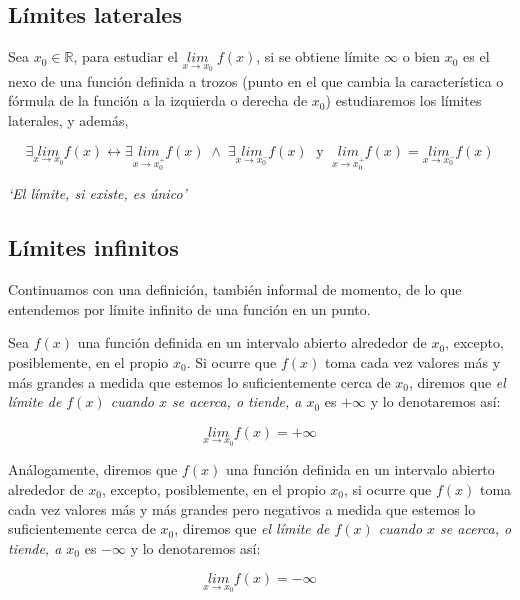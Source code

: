 	
	\subsection{Límites laterales}
	
	
	Sea $x_0 \in \mathbb R$, para estudiar el $ \underset { x\rightarrow x_0}{ lim } \; {f(x)}$, si se obtiene límite $\infty$ o bien $x_0$ es el nexo de una función definida a trozos (punto en el que cambia la característica o fórmula de la función a la izquierda o derecha de $x_0$) estudiaremos los límites laterales, y además,
	
	\begin{equation}	
	\exists \underset {x\to x_0}{lim}{f(x)} \leftrightarrow \exists \underset {x\to x_0^+}{lim}{f(x)} \; \wedge \;  \exists \underset {x\to x_0^-}{lim}{f(x)} \; \mbox { y } \;   \underset {x\to x_0^+}{lim}{f(x)}= \underset {x\to x_0^-}{lim}{f(x)}
	\end{equation}
	
	 \emph{`El límite, si existe, es único'}
	
	\subsection{Límites infinitos}
	
	Continuamos con una definición, también informal de momento, de lo que entendemos por límite infinito de una función en un punto.
	
	\begin{defi}
	
	Sea $f(x)$ una función definida en un intervalo abierto alrededor de $x_0$, excepto, posiblemente, en el propio $x_0$. Si ocurre que $f(x)$ toma cada vez valores más y más grandes  a medida que estemos lo suficientemente cerca de $x_0$, diremos que \textit{el límite de $f(x)$ cuando $x$ se acerca, o tiende, a $x_0$} es $+\infty$ y lo denotaremos así:
	
	\begin{equation}
		\underset { x\rightarrow x_0 }{ lim } {f(x)}=+\infty
	\end{equation}
	
	Análogamente, diremos que $f(x)$ una función definida en un intervalo abierto alrededor de $x_0$, excepto, posiblemente, en el propio $x_0$, si ocurre que $f(x)$ toma cada vez valores más y más grandes pero negativos a medida que estemos lo suficientemente cerca de $x_0$, diremos que \textit{el límite de $f(x)$  cuando $x$ se acerca, o tiende, a $x_0$} es $-\infty$ y lo denotaremos así:
	
	\begin{equation}
		\underset { x\rightarrow x_0 }{ lim } {f(x)}=-\infty
	\end{equation}
		
	\end{defi}
	
